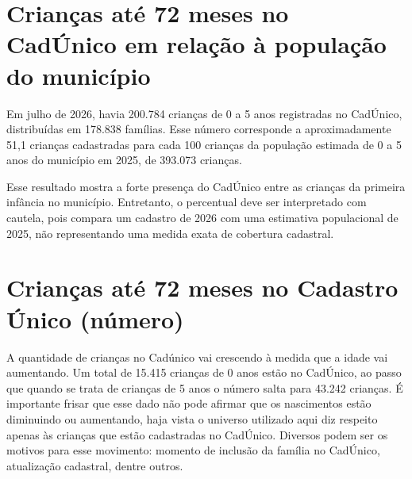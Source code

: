 
\section{Crianças até 72 meses no CadÚnico em relação à população do município}



Em julho de 2026, havia 200.784 crianças de 0 a 5 anos registradas no CadÚnico, distribuídas em 178.838 famílias. Esse número corresponde a aproximadamente 51,1 crianças cadastradas para cada 100 crianças da população estimada de 0 a 5 anos do município em 2025, de 393.073 crianças.

Esse resultado mostra a forte presença do CadÚnico entre as crianças da primeira infância no município. Entretanto, o percentual deve ser interpretado com cautela, pois compara um cadastro de 2026 com uma estimativa populacional de 2025, não representando uma medida exata de cobertura cadastral.

\section{Crianças até 72 meses no Cadastro Único (número)}


A quantidade de crianças no Cadúnico vai crescendo à medida que a idade vai aumentando. Um total de 15.415 crianças de 0 anos estão no CadÚnico, ao passo que quando se trata de crianças de 5 anos o número salta para 43.242 crianças. É importante frisar que esse dado não pode afirmar que os nascimentos estão diminuindo ou aumentando, haja vista o universo utilizado aqui diz respeito apenas às crianças que estão cadastradas no CadÚnico. Diversos podem ser os motivos para esse movimento: momento de inclusão da família no CadÚnico, atualização cadastral, dentre outros.

